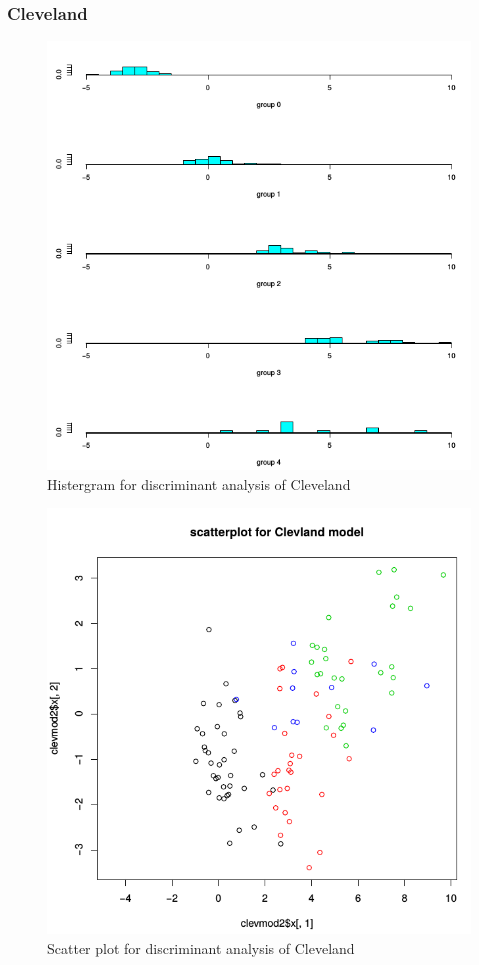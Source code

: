 \documentclass[a4paper]{article}
\begin{document}
\subsubsection{Cleveland}



\begin{figure}[H]
	\begin{center}
		\includegraphics[width=12cm]{Q4_pics/Clev-Histgram.png}
	\end{center}
	\caption{Histergram for discriminant analysis of Cleveland}
	\label{q4_clev_historgram}
\end{figure}

\begin{figure}[H]
	\begin{center}
		\includegraphics[width=12cm]{Q4_pics/Clev-scatter.png}
	\end{center}
	\caption{Scatter plot for discriminant analysis of Cleveland}
	\label{q4_clev_scatter}
\end{figure}
\end{document}

